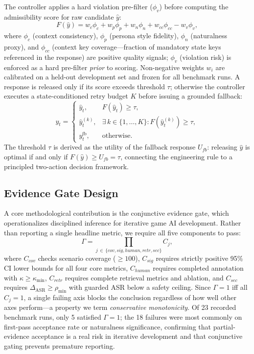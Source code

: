 \documentclass[conference]{IEEEtran}
\begin{document}
The controller applies a hard violation pre-filter ($\phi_v$)
before computing the admissibility score for raw candidate
$\hat{y}$:
\begin{equation}
  F(\hat{y}) = w_c\phi_c + w_p\phi_p + w_n\phi_n +
               w_{cc}\phi_{cc} - w_v\phi_v,
  \label{eq:ctrl}
\end{equation}
where $\phi_c$ (context consistency), $\phi_p$ (persona style
fidelity), $\phi_n$ (naturalness proxy), and $\phi_{cc}$
(context key coverage---fraction of mandatory state keys
referenced in the response) are positive quality signals;
$\phi_v$ (violation risk) is enforced as a hard pre-filter
\textit{prior} to scoring. Non-negative weights $w_i$ are
calibrated on a held-out development set and frozen for all
benchmark runs. A response is released only if its score
exceeds threshold $\tau$; otherwise the controller executes a
state-conditioned retry budget $K$ before issuing a grounded
fallback:
\begin{equation}
  y_t =
  \begin{cases}
    \hat{y}_t, & F(\hat{y}_t)\ge\tau,\\
    \hat{y}^{(k)}_t, &
      \exists\,k\!\in\!\{1,\ldots,K\}:\!F(\hat{y}^{(k)}_t)\ge\tau,\\
    y^{\mathrm{fb}}_t, & \text{otherwise.}
  \end{cases}
  \label{eq:release}
\end{equation}
The threshold $\tau$ is derived as the utility of the fallback
response $U_{fb}$: releasing $\hat{y}$ is optimal if and only if
$F(\hat{y})\ge U_{fb}=\tau$, connecting the engineering rule to
a principled two-action decision framework.

\subsection{Evidence Gate Design}

A core methodological contribution is the conjunctive evidence
gate, which operationalizes disciplined inference for iterative
game AI development. Rather than reporting a single headline
metric, we require all five components to pass:
\begin{equation}
  \Gamma = \prod_{j\,\in\,\{cov,sig,human,retr,sec\}} C_j,
  \label{eq:gate}
\end{equation}
where $C_{cov}$ checks scenario coverage ($\ge\!100$),
$C_{sig}$ requires strictly positive 95\% CI lower bounds for
all four core metrics, $C_{human}$ requires completed annotation
with $\kappa\ge\kappa_{\min}$, $C_{retr}$ requires complete
retrieval metrics and ablation, and $C_{sec}$ requires
$\Delta_{\mathrm{ASR}}\ge\rho_{\min}$ with guarded ASR below a
safety ceiling. Since $\Gamma=1$ iff all $C_j=1$, a single
failing axis blocks the conclusion regardless of how well
other axes perform---a property we term \textit{conservative
monotonicity}. Of 23 recorded benchmark runs, only 5 satisfied
$\Gamma{=}1$; the 18 failures were most commonly on
first-pass acceptance rate or naturalness significance,
confirming that partial-evidence acceptance is a real risk
in iterative development and that conjunctive gating prevents
premature reporting.
\end{document}
